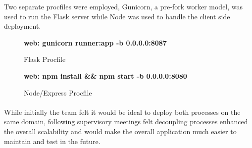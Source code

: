 Two separate procfiles were employed, Gunicorn, a pre-fork worker model, was used to run the Flask server while Node was used to handle the client side deployment.

\begin{figure}[H]
    \centering
    \textbf{web: gunicorn runner:app -b 0.0.0.0:8087}
    \caption{Flask Procfile}
    \label{image:honchoProcfile}
\end{figure}

\begin{figure}[H]
    \centering
    \textbf{web: npm install \&\& npm start -b 0.0.0.0:8080}
    \caption{Node/Express Procfile}
    \label{image:honchoProcfile}
\end{figure}

\paragraph{}
While initially the team felt it would be ideal to deploy both processes on the same domain, following supervisory meetings felt decoupling processes enhanced the overall scalability and would make the overall application much easier to maintain and test in the future.